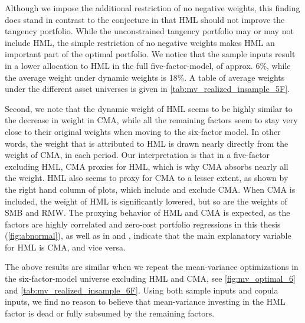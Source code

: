 Although we impose the additional restriction of no negative weights, this finding does stand in contrast to the conjecture in \textcite{FF2015} that HML should not improve the tangency portfolio. While the unconstrained tangency portfolio may or may not include HML, the simple restriction of no negative weights makes HML an important part of the optimal portfolio. We notice that the sample inputs result in a lower allocation to HML in the full five-factor-model, of approx. 6\%, while the average weight under dynamic weights is 18\%. A table of average weights under the different asset universes is given in \autoref{tab:mv_realized_insample_5F}.

Second, we note that the dynamic weight of HML seems to be highly similar to the decrease in weight in CMA, while all the remaining factors seem to stay very close to their original weights when moving to the six-factor model. In other words, the weight that is attributed to HML is drawn nearly directly from the weight of CMA, in each period. Our interpretation is that in a five-factor excluding HML, CMA proxies for HML, which is why CMA absorbs nearly all the weight. HML also seems to proxy for CMA to a lesser extent, as shown by the right hand column of plots, which include and exclude CMA. When CMA is included, the weight of HML is significantly lowered, but so are the weights of SMB and RMW. The proxying behavior of HML and CMA is expected, as the factors are highly correlated and zero-cost portfolio regressions in this thesis (\autoref{fig:abnormal}), as well as in \textcite{FF2015} and \textcite{Asness2015}, indicate that the main explanatory variable for HML is CMA, and vice versa.

The above results are similar when we repeat the mean-variance optimizations in the six-factor-model universe excluding HML and CMA, see \autoref{fig:mv_optimal_6} and \autoref{tab:mv_realized_insample_6F}. Using both sample inputs and copula inputs, we find no reason to believe that mean-variance investing in the HML factor is dead or fully subsumed by the remaining factors.

